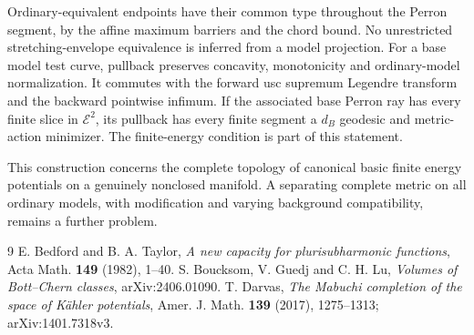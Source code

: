 \documentclass[11pt]{article}
\theoremstyle{remark}\newtheorem{remark}[theorem]{Remark}
\begin{document}
Ordinary-equivalent endpoints have their common type throughout the
Perron segment, by the affine maximum barriers and the chord bound.
No unrestricted stretching-envelope equivalence is inferred from a model
projection. For a base model test curve, pullback preserves concavity,
monotonicity and ordinary-model normalization. It commutes with the forward
usc supremum Legendre transform and the backward pointwise infimum.
If the associated base Perron ray has every finite slice in $\mathcal E^2$,
its pullback has every finite segment a $d_B$ geodesic and metric-action
minimizer. The finite-energy condition is part of this statement.

This construction concerns the complete topology of canonical basic
finite energy potentials on a genuinely nonclosed manifold. A separating
complete metric on all ordinary models, with modification and varying
background compatibility, remains a further problem.

\begin{thebibliography}{9}
 E. Bedford and B. A. Taylor,
\emph{A new capacity for plurisubharmonic functions},
Acta Math. \textbf{149} (1982), 1--40.
 S. Boucksom, V. Guedj and C. H. Lu,
\emph{Volumes of Bott--Chern classes}, arXiv:2406.01090.
 T. Darvas,
\emph{The Mabuchi completion of the space of K\"ahler potentials},
Amer. J. Math. \textbf{139} (2017), 1275--1313;
arXiv:1401.7318v3.
\end{thebibliography}
\end{document}
